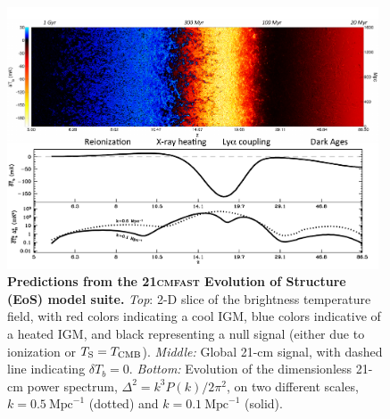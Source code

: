\begin{figure}[]
\begin{center}
\includegraphics[width=0.98\textwidth]{Mirocha/eosFG.pdf}
\end{center}
\caption{{\bf Predictions from the \textsc{21cmfast} Evolution of Structure (EoS) model suite.} \textit{Top}: 2-D slice of the brightness temperature field, with red colors indicating a cool IGM, blue colors indicative of a heated IGM, and black representing a null signal (either due to ionization or $T_{\text{S}}=T_{\text{CMB}}$). \textit{Middle:} Global 21-cm signal, with dashed line indicating  $\delta T_b = 0$. \textit{Bottom:} Evolution of the dimensionless 21-cm power spectrum, $\Delta^2 = k^3 P(k) / 2\pi^2$, on two different scales, $k=0.5 \ \mathrm{Mpc}^{-1}$ (dotted) and $k=0.1 \ \mathrm{Mpc}^{-1}$ (solid).}
\label{fig:eosFG}
\end{figure}

